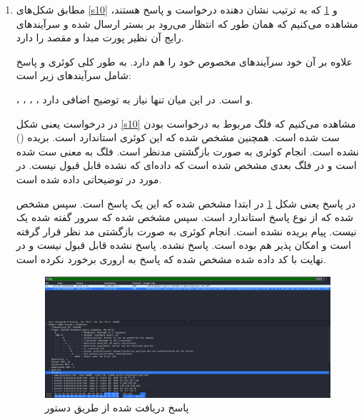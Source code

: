 \documentclass[12pt]{article}
\begin{document}
\begin{enumerate}
\item

مطابق شکل‌های \ref{s10} و \ref{s12} که به ترتیب نشان دهنده درخواست و پاسخ هستند، مشاهده می‌کنیم که همان طور که انتظار می‌رود  بر بستر  ارسال شده و سرآیند‌های رایج آن نظیر پورت مبدا و مقصد را دارد.

علاوه بر آن خود  سرآیندهای مخصوص خود را هم دارد. به طور کلی کوئری و پاسخ  شامل سرآیند‌های زیر است:

، ، ، ،  و 
است. در این میان تنها  نیاز به توضیح اضافی دارد.

در درخواست یعنی شکل
\ref{s10}
مشاهده می‌کنیم که فلگ مربوط به درخواست بودن ست شده است. همچنین مشخص شده که این کوئری استاندارد است. بریده () نشده است. انجام کوئری به صورت بازگشتی مدنظر است. فلگ  به معنی
ست شده است و در فلگ بعدی مشخص شده است که داده‌ای که 
نشده قابل قبول نیست. در مورد
در 
\href{https://datatracker.ietf.org/doc/html/rfc3655}{\textcolor{blue}{\underline{}}}	 	
توضیحاتی داده شده است.

در پاسخ یعنی شکل
\ref{s12}
در ابتدا مشخص شده که این یک پاسخ است. سپس مشخص شده که از نوع پاسخ استاندارد است. سپس مشخص شده که سرور گفته شده یک
نیست. پیام بریده نشده است. انجام کوئری به صورت بازگشتی مد نظر قرار گرفته است و امکان پذیر هم بوده است. پاسخ
نشده. پاسخ
نشده قابل قبول نیست و در نهایت با کد داده شده مشخص شده که پاسخ به اروری برخورد نکرده است.


	\begin{figure}[H]
	\centering
	\includegraphics[scale=0.25]{images/11.png}
	\caption{پاسخ دریافت شده   از طریق دستور
		} 
	\label{s12}
\end{figure}
\end{enumerate}
\end{document}
